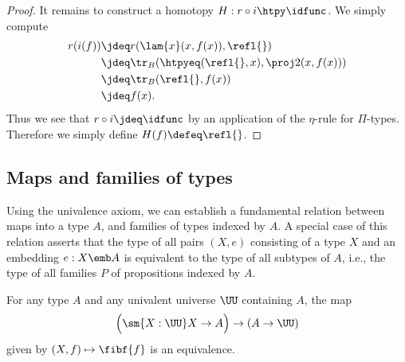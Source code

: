 \begin{proof}
It remains to construct a homotopy $H:r\circ i\htpy \idfunc$. We simply compute
\begin{align*}
  r(i(f)) & \jdeq r(\lam{x}(x,f(x)),\refl{}) \\
          & \jdeq \tr_B(\htpyeq(\refl{},x),\proj 2(x,f(x))) \\
          & \jdeq \tr_B(\refl{},f(x)) \\
          & \jdeq f(x).
\end{align*}
Thus we see that $r\circ i\jdeq \idfunc$ by an application of the $\eta$-rule for $\Pi$-types. Therefore we simply define $H(f)\defeq\refl{}$.
\end{proof}

\subsection{Maps and families of types}

Using the univalence axiom, we can establish a fundamental relation between maps into a type $A$, and families of types indexed by $A$. A special case of this relation asserts that the type of all pairs $(X,e)$ consisting of a type $X$ and an embedding $e:X\emb A$ is equivalent to the type of all subtypes of $A$, i.e., the type of all families $P$ of propositions indexed by $A$.

\begin{thm}\label{thm:object-classifier}
  For any type $A$ and any univalent universe $\UU$ containing $A$, the map
  \begin{equation*}
    \Big(\sm{X:\UU}X\to A\Big)\to (A\to \UU)
  \end{equation*}
  given by $(X,f)\mapsto\fibf{f}$ is an equivalence.
\end{thm}

